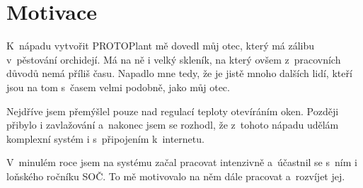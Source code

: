 \chapter{Motivace}
K~nápadu vytvořit  PROTOPlant mě dovedl můj otec, který má zálibu v~pěs\-to\-vá\-ní orchidejí.
Má na ně i velký skleník, na který ovšem z~pracovních důvodů nemá příliš času.
Napadlo mne tedy, že je jistě mnoho dalších lidí, kteří jsou na tom s~časem velmi podobně, jako můj otec.

Nejdříve jsem přemýšlel pouze nad regulací teploty otevíráním oken.
Později přibylo i zavlažování a~nakonec jsem se rozhodl, že z~tohoto nápadu udělám komplexní systém i s~připojením k~internetu.

V~minulém roce jsem na systému začal pracovat intenzivně a~účastnil se s~ním i loňského ročníku SOČ.
To mě motivovalo na něm dále pracovat a~rozvíjet jej.

\fxnote[author=PŠ]{\textcolor{mygreen}{Zde je ještě potřeba provést úpravy.}}

\newpage
